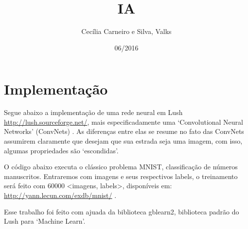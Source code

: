 \documentclass[11pt]{article}
\title{IA}
\author{Cecília Carneiro e Silva, Valks}
\date{06/2016}
\begin{document}
\maketitle

\setcounter{tocdepth}{3}
\tableofcontents
\vspace*{1cm}

\section{Implementação}
\label{sec-1}


  Segue abaixo a implementação de uma rede neural em Lush \href{http://lush.sourceforge.net/}{http://lush.sourceforge.net/}, mais especificadamente uma `Convolutional Neural Networks' (ConvNets) . As diferenças entre elas se resume no fato das ConvNets assumirem claramente que desejam que sua estrada seja uma imagem, com isso, algumas propriedades são `escondidas'.

  O código abaixo executa o clássico problema MNIST, classificação de números manuscritos. Entraremos com imagens e seus respectivos labels, o treinamento será feito com 60000 <imagens, labels>, disponíveis em: \href{http://yann.lecun.com/exdb/mnist/}{http://yann.lecun.com/exdb/mnist/} .
  
  Esse trabalho foi feito com ajuada da biblioteca gblearn2, biblioteca padrão do Lush para `Machine Learn'.
\end{document}

